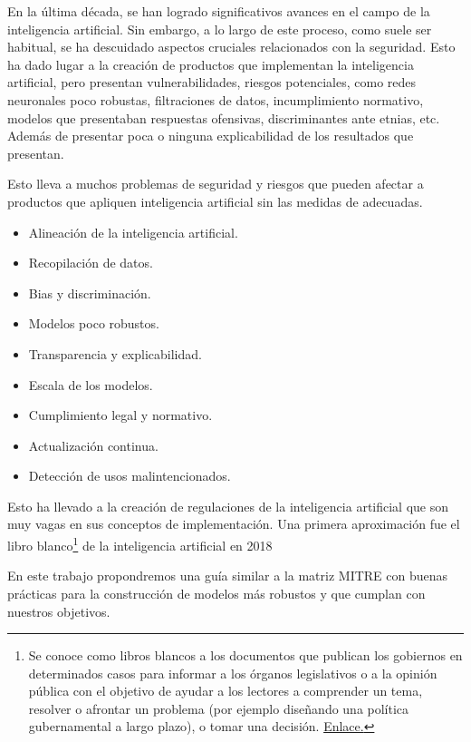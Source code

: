 En la última década, se han logrado significativos avances en el campo de la inteligencia artificial. Sin embargo, a lo largo de este proceso, como suele ser habitual, se ha descuidado  aspectos cruciales relacionados con la seguridad. Esto ha dado lugar a la creación de productos que implementan la inteligencia artificial, pero presentan vulnerabilidades, riesgos potenciales, como redes neuronales poco robustas, filtraciones de datos, incumplimiento normativo, modelos que presentaban respuestas ofensivas, discriminantes ante etnias, etc. Además de presentar poca o ninguna explicabilidad de los resultados que presentan.

Esto lleva a muchos problemas de seguridad y riesgos que pueden afectar a productos que apliquen inteligencia artificial sin las medidas de adecuadas.

\begin{itemize}
    \item Alineación de la inteligencia artificial.
    \item Recopilación de datos.
    \item Bias y discriminación.
    \item Modelos poco robustos.
    \item Transparencia y explicabilidad.
    \item Escala de los modelos.
    \item Cumplimiento legal y normativo.
    \item Actualización continua.
    \item Detección de usos malintencionados.
\end{itemize}

Esto ha llevado a la creación de regulaciones de la inteligencia artificial que son muy vagas en sus conceptos de implementación.
Una primera aproximación fue el libro blanco\footnote{Se conoce como libros blancos a los documentos que publican los gobiernos en determinados casos para informar a los órganos legislativos o a la opinión pública con el objetivo de ayudar a los lectores a comprender un tema, resolver o afrontar un problema (por ejemplo diseñando una política gubernamental a largo plazo), o tomar una decisión. \href{https://es.wikipedia.org/wiki/Libro_blanco}{Enlace.}} de la inteligencia artificial en 2018 \cite{whitebook2020AI}

En este trabajo propondremos una guía similar a la matriz \gls{MITRE} con buenas prácticas para la construcción de modelos más robustos y que cumplan con nuestros objetivos.

